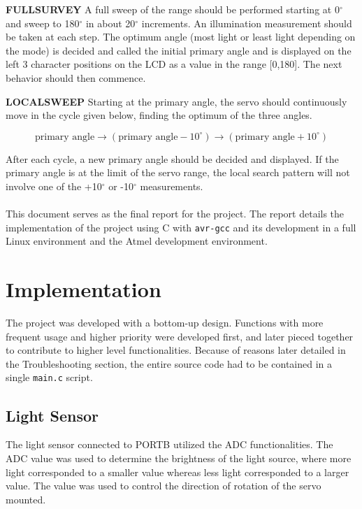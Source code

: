 \documentclass[usletter, 12pt]{article}
\begin{document}
    \noindent \textbf{FULLSURVEY} A full sweep of the range should be performed
    starting at 0$^{\circ}$ and sweep to 180$^{\circ}$ in about 20$^{\circ}$
    increments. An illumination measurement should be taken at each step. The
    optimum angle (most light or least light depending on the mode) is decided
    and called the initial primary angle and is displayed on the left 3
    character positions on the LCD as a value in the range [0,180]. The next
    behavior should then commence.

    \noindent \textbf{LOCALSWEEP} Starting at the primary angle, the servo should continuously move in the cycle given below, finding
    the optimum of the three angles.

        \[ \text{primary angle} \rightarrow (\text{primary angle} - 10^\circ)
        \rightarrow (\text{primary angle} + 10^\circ) \]

    \noindent After each cycle, a new primary angle should be decided and
    displayed. If the primary angle is at the limit of the servo range, the
    local search pattern will not involve one of the +10$^{\circ}$ or
    -10$^{\circ}$ measurements. \\~\\
    \noindent This document serves as the final report for the project. The
    report details the implementation of the project using C with \texttt{avr-gcc} and its development in a full Linux environment and the Atmel
    development environment.

    \section{Implementation} The project was developed with a bottom-up
    design. Functions with more frequent usage and higher priority were
    developed first, and later pieced together to contribute to higher level
    functionalities. Because of reasons later detailed in the Troubleshooting
    section, the entire source code had to be contained in a single
    \texttt{main.c} script.

    \subsection{Light Sensor} The light sensor connected to PORTB utilized the
    ADC functionalities. The ADC value was used to determine the brightness of
    the light source, where more light corresponded to a smaller value whereas
    less light corresponded to a larger value. The value was used to control
    the direction of rotation of the servo mounted. \\~\\
\end{document}
